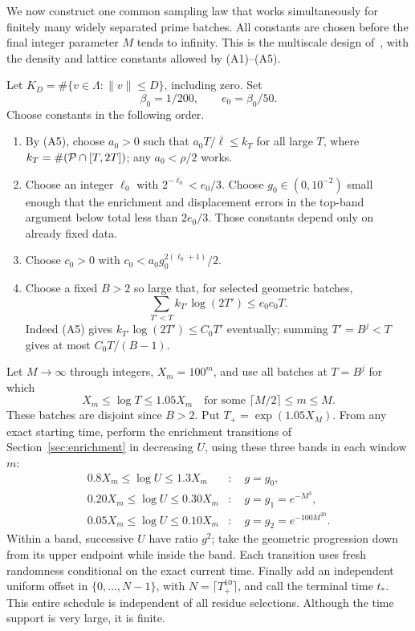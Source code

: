 \documentclass[11pt]{article}
\numberwithin{equation}{section}
\theoremstyle{definition}\newtheorem{definition}[theorem]{Definition}
\theoremstyle{remark}\newtheorem{remark}[theorem]{Remark}
\newcommand{\norm}[1]{\lVert #1\rVert}
\newcommand{\set}[1]{\{#1\}}
\newcommand{\Lb}{\overline{\ell}}
\begin{document}
We now construct one common sampling law that works simultaneously for finitely many widely separated prime batches. All constants are chosen before the final integer parameter $M$ tends to infinity. This is the multiscale design of~\cite[Section 6]{openai}, with the density and lattice constants allowed by (A1)--(A5).

Let $K_D=\#\set{v\in\Lambda:\norm v\le D}$, including zero. Set
\[
 \beta_0=1/200,\qquad e_0=\beta_0/50.
\]
Choose constants in the following order.
\begin{enumerate}[leftmargin=2em]
\item By (A5), choose $a_0>0$ such that $a_0T/\Lb\le k_T$ for all large $T$, where $k_T=\#(\mathcal P\cap[T,2T])$; any $a_0<\rho/2$ works.
\item Choose an integer $\ell_0$ with $2^{-\ell_0}<e_0/3$. Choose $g_0\in(0,10^{-2})$ small enough that the enrichment and displacement errors in the top-band argument below total less than $2e_0/3$. Those constants depend only on already fixed data.
\item Choose $c_0>0$ with $c_0<a_0g_0^{2(\ell_0+1)}/2$.
\item Choose a fixed $B>2$ so large that, for selected geometric batches,
\begin{equation}\label{eq:oldalphabet}
 \sum_{T'<T}k_{T'}\log(2T')\le e_0c_0T.
\end{equation}
Indeed (A5) gives $k_{T'}\log(2T')\le C_0T'$ eventually; summing $T'=B^j<T$ gives at most $C_0T/(B-1)$.
\end{enumerate}

Let $M\to\infty$ through integers, $X_m=100^m$, and use all batches at $T=B^j$ for which
\[
 X_m\le\log T\le1.05X_m
 \quad\text{for some }\lceil M/2\rceil\le m\le M.
\]
These batches are disjoint since $B>2$. Put $T_+=\exp(1.05X_M)$. From any exact starting time, perform the enrichment transitions of Section~\ref{sec:enrichment} in decreasing $U$, using these three bands in each window $m$:
\begin{align*}
 0.8X_m\le\log U\le1.3X_m &: \quad g=g_0,\\
 0.20X_m\le\log U\le0.30X_m &: \quad g=g_1=e^{-M^3},\\
 0.05X_m\le\log U\le0.10X_m &: \quad g=g_2=e^{-100M^{20}}.
\end{align*}
Within a band, successive $U$ have ratio $g^2$; take the geometric progression down from its upper endpoint while inside the band. Each transition uses fresh randomness conditional on the exact current time. Finally add an independent uniform offset in $\{0,\ldots,N-1\}$, with $N=\lceil T_+^{10}\rceil$, and call the terminal time $t_*$. This entire schedule is independent of all residue selections. Although the time support is very large, it is finite.
\end{document}
